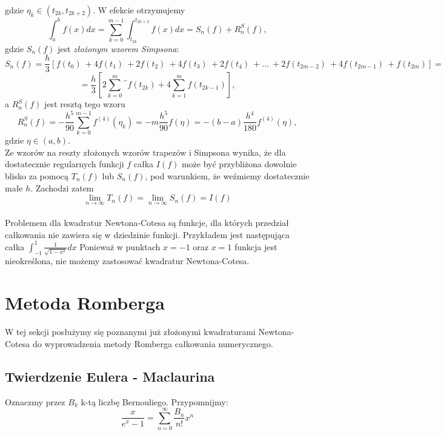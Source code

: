 \documentclass{article}
\begin{document}
gdzie $\eta_k \in (t_{2k}, t_{2k + 2})$. W efekcie otrzymujemy
\begin{equation*}
	\int_a^b f(x) dx = \sum_{k = 0}^{m - 1} \int_{t_{2k}}^{t_{2k + 2}} f(x) dx = S_n(f) + R_n^S(f),
\end{equation*}
gdzie $S_n(f)$ jest \emph{złożonym wzorem Simpsona}:
\begin{equation*}
	S_n(f) = \frac{h}{3}[f(t_0)\ + 4 f(t_1)\ + 2f(t_2)\ + 4f(t_3)\ + 2f(t_4)\ + \ldots\ + 2f(t_{2m - 2})\ + 4f(t_{2m - 1})\ + f(t_{2m})] =
\end{equation*}
\begin{equation*}
	= \frac{h}{3}[2 \sum_{k = 0}^m {}^{\prime\prime} f(t_{2k}) + 4 \sum_{k = 1}^m f(t_{2k - 1})],
\end{equation*}
a $R_n^S(f)$ jest resztą tego wzoru
\begin{equation*}
	R_n^S(f) = - \frac{h^5}{90} \sum_{k = 0}^{m - 1} f^{(4)}(\eta_k) = - m \frac{h^5}{90} f(\eta) = -(b - a) \frac{h^4}{180} f^{(4)} (\eta),
\end{equation*}
gdzie $\eta \in (a,b)$. \\
Ze wzorów na reszty złożonych wzorów trapezów i Simpsona wynika, że dla dostatecznie regularnych funkcji $f$ całka $I(f)$ może być przybliżona
dowolnie blisko za pomocą $T_n(f)$ lub $S_n(f)$, pod warunkiem, że weźmiemy dostatecznie małe $h$. Zachodzi zatem
\begin{equation*}
	\lim_{n \to \infty} T_n(f) = \lim_{n \to \infty} S_n(f) = I(f)
\end{equation*}
\\
Problemem dla kwadratur Newtona-Cotesa są funkcje, dla których przedział całkowania nie zawiera się w dziedzinie funkcji.
Przykładem jest następująca całka $\int_{-1}^1 \frac{1}{\sqrt{1 - x^2}} dx$ Ponieważ w punktach $x = -1$ oraz $x = 1$ funkcja jest nieokreślona,
nie możemy zastosować kwadratur Newtona-Cotesa.

\section{Metoda Romberga}
W tej sekcji posłużymy się poznanymi już złożonymi kwadraturami Newtona-Cotesa do wyprowadzenia metody Romberga
całkowania numerycznego.
\subsection{Twierdzenie Eulera - Maclaurina}
Oznaczmy przez $B_k$ k-tą liczbę Bernouliego. Przypomnijmy:
\begin{equation*}
	\frac{x}{e^x - 1} = \sum_{n = 0}^\infty \frac{B_n}{n!} x^n
\end{equation*}
\end{document}
